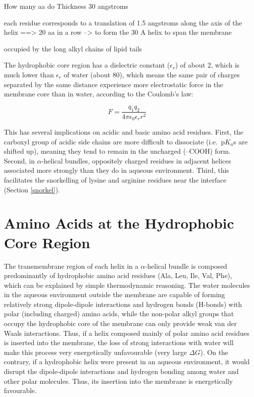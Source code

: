 \documentclass[
]{article}
\begin{document}
How many aa do
Thickness 30 angstroms

each residue corresponds to a translation of 1.5 angstroms along the axis of the helix
==\textgreater{} 20 aa in a row --\textgreater{} to form the 30 A helix to span the membrane

occupied by the long alkyl chains of lipid tails

The hydrophobic core region has a dielectric constant (\(\epsilon_{r}\)) of about 2, which is much lower than \(\epsilon_{r}\) of water (about 80), which means the same pair of charges separated by the same distance experience more electrostatic force in the membrane core than in water, according to the Coulomb's law:

\[F = \dfrac{q_1 q_2}{4\pi \epsilon_0 \epsilon_r r^2}\]

This has several implications on acidic and basic amino acid residues. First, the carboxyl group of acidic side chains are more difficult to dissociate (i.e.~p\(K_a\)s are shifted up), meaning they tend to remain in the uncharged (--COOH) form. Second, in \(\alpha\)-helical bundles, oppositely charged residues in adjacent helices associated more strongly than they do in aqueous environment. Third, this facilitates the snorkelling of lysine and arginine residues near the interface (Section \ref{snorkel}).

\hypertarget{amino-acids-at-the-hydrophobic-core-region}{%
\section{Amino Acids at the Hydrophobic Core Region}\label{amino-acids-at-the-hydrophobic-core-region}}

The transmembrane region of each helix in a \(\alpha\)-helical bundle is composed predominantly of hydrophobic amino acid residues (Ala, Leu, Ile, Val, Phe), which can be explained by simple thermodynamic reasoning. The water molecules in the aqueous environment outside the membrane are capable of forming relatively strong dipole-dipole interactions and hydrogen bonds (H-bonds) with polar (including charged) amino acids, while the non-polar alkyl groups that occupy the hydrophobic core of the membrane can only provide weak van der Waals interactions. Thus, if a helix composed mainly of polar amino acid residues is inserted into the membrane, the loss of strong interactions with water will make this process very energetically unfavourable (very large \(\Delta G\)). On the contrary, if a hydrophobic helix were present in an aqueous environment, it would disrupt the dipole-dipole interactions and hydrogen bonding among water and other polar molecules. Thus, its insertion into the membrane is energetically favourable.
\end{document}
